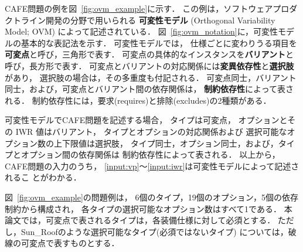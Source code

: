 CAFE問題の例を図~\ref{fig:ovm_example}に示す．
この例は，ソフトウェアプロダクトライン開発の分野で用いられる
\textbf{可変性モデル} (Orthogonal Variability Model; OVM\cite{Pohl05:sple})
によって記述されている．
図~\ref{fig:ovm_notation}に，可変性モデルの基本的な表記法を示す．
可変性モデルでは，
仕様ごとに変わりうる項目を\textbf{可変点}と呼び，三角形で表す．
可変点の具体的なインスタンスを\textbf{バリアント}と呼び，長方形で表す．
可変点とバリアントの対応関係には\textbf{変異依存性}と\textbf{選択肢}があり，
選択肢の場合は，その多重度も付記される．
可変点同士，バリアント同士，および，可変点とバリアント間の依存関係は，
\textbf{制約依存性}によって表される．
制約依存性には，要求(\textsf{requires})と排除(\textsf{excludes})の2種類がある．

可変性モデルでCAFE問題を記述する場合，
タイプは可変点，
オプションとその IWR 値はバリアント，
タイプとオプションの対応関係および
選択可能なオプション数の上下限値は選択肢，
タイプ同士，オプション同士，および，タイプとオプション間の依存関係は
制約依存性によって表される．
以上から，CAFE問題の入力のうち，
\ref{input:vp}〜\ref{input:iwr}は可変性モデルによって記述されるこ
とがわかる．

図~\ref{fig:ovm_example}の問題例は，
6個のタイプ，19個のオプション，5個の依存制約から構成され，
各タイプの選択可能なオプション数はすべて1である．
本論文では，可変点で表されるタイプは，各装備仕様に対して必須とする．
ただし，\textsf{Sun\_Roof}のような選択可能なタイプ(必須ではないタイプ)
については，破線の可変点で表すものとする．

